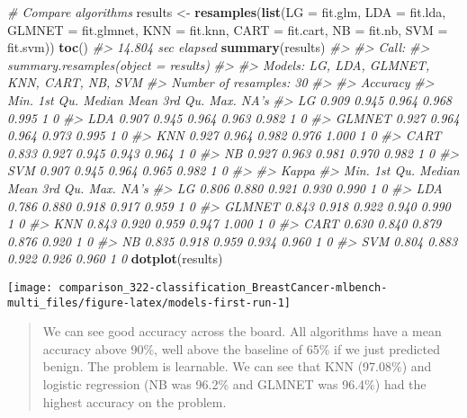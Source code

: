 \documentclass[]{book}
\newenvironment{Shaded}{\begin{snugshade}}{\end{snugshade}}
\newcommand{\CommentTok}[1]{\textcolor[rgb]{0.56,0.35,0.01}{\textit{#1}}}
\newcommand{\DataTypeTok}[1]{\textcolor[rgb]{0.13,0.29,0.53}{#1}}
\newcommand{\KeywordTok}[1]{\textcolor[rgb]{0.13,0.29,0.53}{\textbf{#1}}}
\newcommand{\NormalTok}[1]{#1}
\newcommand{\StringTok}[1]{\textcolor[rgb]{0.31,0.60,0.02}{#1}}
\begin{document}
\begin{Shaded}
\begin{Highlighting}[]
\CommentTok{# Compare algorithms}
\NormalTok{results <-}\StringTok{ }\KeywordTok{resamples}\NormalTok{(}\KeywordTok{list}\NormalTok{(}\DataTypeTok{LG     =}\NormalTok{ fit.glm, }
                          \DataTypeTok{LDA    =}\NormalTok{ fit.lda, }
                          \DataTypeTok{GLMNET =}\NormalTok{ fit.glmnet, }
                          \DataTypeTok{KNN    =}\NormalTok{ fit.knn, }
                          \DataTypeTok{CART   =}\NormalTok{ fit.cart, }
                          \DataTypeTok{NB     =}\NormalTok{ fit.nb, }
                          \DataTypeTok{SVM    =}\NormalTok{ fit.svm))}
\KeywordTok{toc}\NormalTok{()}
\CommentTok{#> 14.804 sec elapsed}
\KeywordTok{summary}\NormalTok{(results)}
\CommentTok{#> }
\CommentTok{#> Call:}
\CommentTok{#> summary.resamples(object = results)}
\CommentTok{#> }
\CommentTok{#> Models: LG, LDA, GLMNET, KNN, CART, NB, SVM }
\CommentTok{#> Number of resamples: 30 }
\CommentTok{#> }
\CommentTok{#> Accuracy }
\CommentTok{#>         Min. 1st Qu. Median  Mean 3rd Qu. Max. NA's}
\CommentTok{#> LG     0.909   0.945  0.964 0.968   0.995    1    0}
\CommentTok{#> LDA    0.907   0.945  0.964 0.963   0.982    1    0}
\CommentTok{#> GLMNET 0.927   0.964  0.964 0.973   0.995    1    0}
\CommentTok{#> KNN    0.927   0.964  0.982 0.976   1.000    1    0}
\CommentTok{#> CART   0.833   0.927  0.945 0.943   0.964    1    0}
\CommentTok{#> NB     0.927   0.963  0.981 0.970   0.982    1    0}
\CommentTok{#> SVM    0.907   0.945  0.964 0.965   0.982    1    0}
\CommentTok{#> }
\CommentTok{#> Kappa }
\CommentTok{#>         Min. 1st Qu. Median  Mean 3rd Qu. Max. NA's}
\CommentTok{#> LG     0.806   0.880  0.921 0.930   0.990    1    0}
\CommentTok{#> LDA    0.786   0.880  0.918 0.917   0.959    1    0}
\CommentTok{#> GLMNET 0.843   0.918  0.922 0.940   0.990    1    0}
\CommentTok{#> KNN    0.843   0.920  0.959 0.947   1.000    1    0}
\CommentTok{#> CART   0.630   0.840  0.879 0.876   0.920    1    0}
\CommentTok{#> NB     0.835   0.918  0.959 0.934   0.960    1    0}
\CommentTok{#> SVM    0.804   0.883  0.922 0.926   0.960    1    0}
\KeywordTok{dotplot}\NormalTok{(results)}
\end{Highlighting}
\end{Shaded}

\begin{center}\texttt{[image: comparison\_322-classification\_BreastCancer-mlbench-multi\_files/figure-latex/models-first-run-1]} \end{center}

\begin{quote}
We can see good accuracy across the board. All algorithms have a mean accuracy
above 90\%, well above the baseline of 65\% if we just predicted benign. The
problem is learnable. We can see that KNN (97.08\%) and logistic regression (NB
was 96.2\% and GLMNET was 96.4\%) had the highest accuracy on the problem.
\end{quote}
\end{document}
